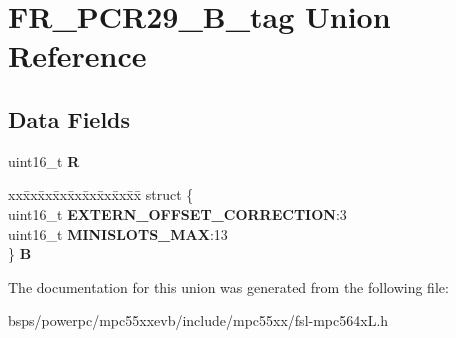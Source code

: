 \hypertarget{unionFR__PCR29__16B__tag}{}\section{F\+R\+\_\+\+P\+C\+R29\+\_\+B\+\_\+tag Union Reference}
\label{unionFR__PCR29__16B__tag}
\subsection*{Data Fields}
\begin{DoxyCompactItemize}
\item 
\mbox{\label{unionFR__PCR29__16B__tag_ad01e2d270e8058d8317d6271998dc136}} 
uint16\+\_\+t {\bfseries R}
\item 
\mbox{\label{unionFR__PCR29__16B__tag_a0ded7d2cd51bf1bd4c23844efa588511}} 
\begin{tabbing}
xx\=xx\=xx\=xx\=xx\=xx\=xx\=xx\=xx\=\kill
struct \{\\
\>uint16\_t {\bfseries EXTERN\_OFFSET\_CORRECTION}:3\\
\>uint16\_t {\bfseries MINISLOTS\_MAX}:13\\
\} {\bfseries B}\\

\end{tabbing}\end{DoxyCompactItemize}


The documentation for this union was generated from the following file\+:\begin{DoxyCompactItemize}
\item 
bsps/powerpc/mpc55xxevb/include/mpc55xx/fsl-\/mpc564x\+L.\+h\end{DoxyCompactItemize}
